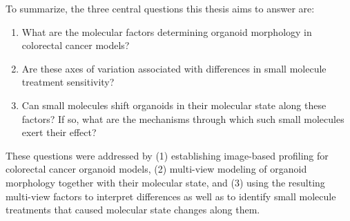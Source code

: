 \begin{flushleft}
To summarize, the three central questions this thesis aims to answer are:
\begin{enumerate}
    \item What are the molecular factors determining organoid morphology in colorectal cancer models?
    \item Are these axes of variation associated with differences in small molecule treatment sensitivity? 
    \item Can small molecules shift organoids in their molecular state along these factors? If so, what are the mechanisms through which such small molecules exert their effect?
\end{enumerate}

These questions were addressed by (1) establishing image-based profiling for colorectal cancer organoid models, (2) multi-view modeling of organoid morphology together with their molecular state, and (3) using the resulting multi-view factors to interpret differences as well as to identify small molecule treatments that caused molecular state changes along them.

\end{flushleft}